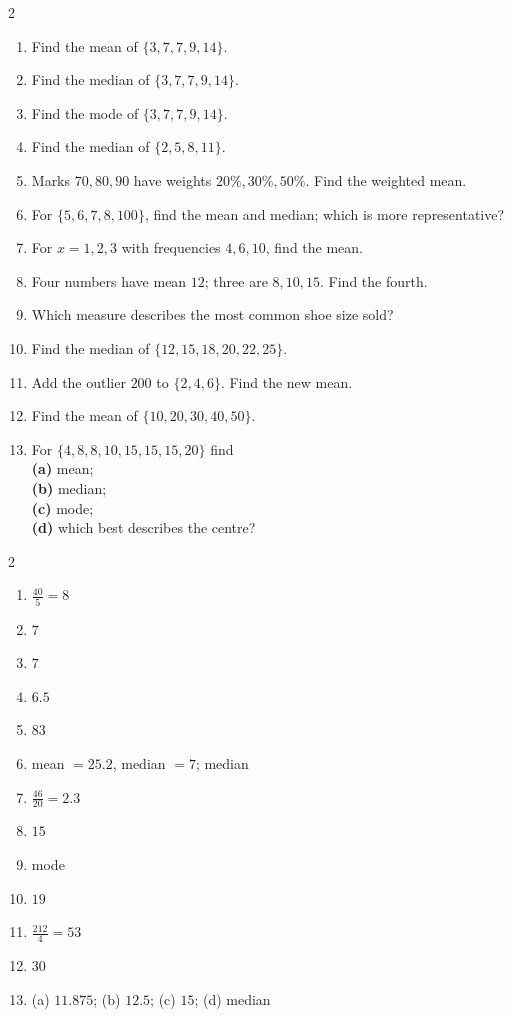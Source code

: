 \documentclass[11pt]{article}
\begin{document}
\clearpage
{}

\begin{recapbox}
\begin{multicols}{2}
\small
\begin{enumerate}[leftmargin=*,itemsep=3pt]
  \item Find the mean of $\{3,7,7,9,14\}$.
  \item Find the median of $\{3,7,7,9,14\}$.
  \item Find the mode of $\{3,7,7,9,14\}$.
  \item Find the median of $\{2,5,8,11\}$.
  \item Marks $70,80,90$ have weights $20\%,30\%,50\%$. Find the weighted mean.
  \item For $\{5,6,7,8,100\}$, find the mean and median; which is more representative?
  \item For $x=1,2,3$ with frequencies $4,6,10$, find the mean.
  \item Four numbers have mean $12$; three are $8,10,15$. Find the fourth.
  \item Which measure describes the most common shoe size sold?
  \item Find the median of $\{12,15,18,20,22,25\}$.
  \item Add the outlier $200$ to $\{2,4,6\}$. Find the new mean.
  \item Find the mean of $\{10,20,30,40,50\}$.
  \item For $\{4,8,8,10,15,15,15,20\}$ find \\ \textbf{(a)} mean; \\ \textbf{(b)} median; \\ \textbf{(c)} mode; \\ \textbf{(d)} which best describes the centre?
\end{enumerate}
\end{multicols}
\end{recapbox}

\begin{keybox}
\begin{multicols}{2}
\small
\begin{enumerate}[leftmargin=*,itemsep=3pt]
  \item $\tfrac{40}{5}=8$
  \item $7$
  \item $7$
  \item $6.5$
  \item $83$
  \item mean $=25.2$, median $=7$; median
  \item $\tfrac{46}{20}=2.3$
  \item $15$
  \item mode
  \item $19$
  \item $\tfrac{212}{4}=53$
  \item $30$
  \item (a) $11.875$; (b) $12.5$; (c) $15$; (d) median
\end{enumerate}
\end{multicols}
\end{keybox}
\end{document}
